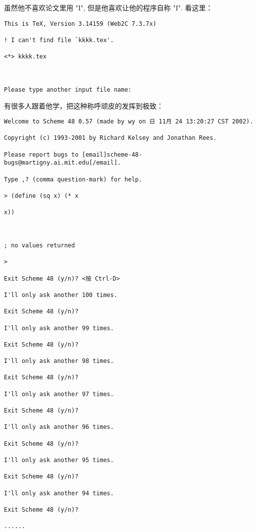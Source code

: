 虽然他不喜欢论文里用 "I", 但是他喜欢让他的程序自称 "I". 看这里： 


\begin{verbatim}
This is TeX, Version 3.14159 (Web2C 7.3.7x) 

! I can't find file `kkkk.tex'. 

<*> kkkk.tex 



Please type another input file name: 

\end{verbatim}





有很多人跟着他学，把这种称呼顽皮的发挥到极致： 
\begin{verbatim}
Welcome to Scheme 48 0.57 (made by wy on 日 11月 24 13:20:27 CST 2002). 

Copyright (c) 1993-2001 by Richard Kelsey and Jonathan Rees. 

Please report bugs to [email]scheme-48-bugs@martigny.ai.mit.edu[/email]. 

Type ,? (comma question-mark) for help. 

> (define (sq x) (* x 

x)) 



; no values returned 

> 

Exit Scheme 48 (y/n)? <按 Ctrl-D> 

I'll only ask another 100 times. 

Exit Scheme 48 (y/n)? 

I'll only ask another 99 times. 

Exit Scheme 48 (y/n)? 

I'll only ask another 98 times. 

Exit Scheme 48 (y/n)? 

I'll only ask another 97 times. 

Exit Scheme 48 (y/n)? 

I'll only ask another 96 times. 

Exit Scheme 48 (y/n)? 

I'll only ask another 95 times. 

Exit Scheme 48 (y/n)? 

I'll only ask another 94 times. 

Exit Scheme 48 (y/n)? 

...... 

\end{verbatim}



